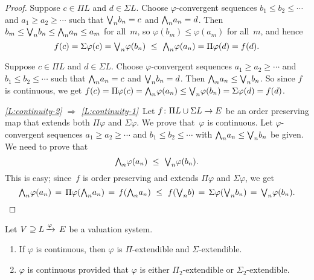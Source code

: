 \begin{proof}
Suppose $c\in \Pi L$ and $d\in \Sigma L$.
Choose $\varphi$-convergent
 sequences $b_1 \leq b_2 \leq \dotsb$
and  $a_1 \geq a_2 \geq \dotsb$ 
such that 
$\textstyle{\bigvee}_n b_n = c$
and 
$\textstyle{\bigwedge}_n a_n = d$.
Then $b_m \leq \textstyle{\bigvee}_n b_n \leq \textstyle{\bigwedge}_n a_n \leq a_m$
for all~$m$,
so $\varphi(b_m)\leq \varphi(a_m)$ for all~$m$,
and hence
\begin{equation*}
f(c) = \Sigma\varphi(c)
= \bv_n \varphi(b_n)
\ \leq\ 
\bw_n \varphi(a_n)
= \Pi \varphi(d)
= f(d).
\end{equation*}

Suppose $c\in \Pi L$ and $d\in \Sigma L$.
Choose $\varphi$-convergent sequences $a_1 \geq a_2 \geq \dotsb$ 
and $b_1 \leq b_2 \leq \dotsb$
such that $\textstyle{\bigwedge}_n a_n = c$ and $\textstyle{\bigvee}_n b_n = d$.
Then $\textstyle{\bigwedge}_n a_n \leq \textstyle{\bigvee}_n b_n $.
So since $f$ is continuous, 
we get 
$f(c)= \Pi\varphi(c) =\textstyle{\bigwedge}_n\varphi(a_n) 
\leq\textstyle{\bigvee}_n\varphi(b_n) = \Sigma\varphi(d) = f(d)$.

\vspace{.3em}

\noindent\emph{\ref{L:continuity-2}
$\Longrightarrow$
\ref{L:continuity-1}}\ 
Let $f\colon \Pi L \cup \Sigma L \rightarrow E$
be an order preserving map that extends both $\Pi\varphi$
and $\Sigma \varphi$.
We prove that~$\varphi$ is continuous.
Let $\varphi$-convergent sequences
$a_1 \geq a_2 \geq \dotsb$
and $b_1 \leq b_2 \leq \dotsb$
with $\textstyle{\bigwedge}_n a_n \leq \textstyle{\bigvee}_n b_n$
be given.
We need to prove that  
\begin{equation*}
\textstyle{\bigwedge}_n \varphi(a_n)\ \leq\  \textstyle{\bigvee}_n \varphi(b_n).
\end{equation*}
This is easy;
since~$f$ is order preserving
and extends $\Pi\varphi$ and $\Sigma\varphi$,
we get 
\begin{equation*}
\textstyle{\bigwedge}_n \varphi(a_n)
\,=\,
\Pi\varphi(\textstyle{\bigwedge}_n a_n)
\,=\,
 f(\textstyle{\bigwedge}_n a_n)
\ \leq\  
f(\textstyle{\bigvee}_n b)
\,=\,
\Sigma\varphi(\textstyle{\bigvee}_n b_n)
\,=\,
\textstyle{\bigvee}_n \varphi(b_n).\qedhere
\end{equation*}
\end{proof}
%
%
\begin{cor}
\label{C:cont-imp}
Let $V \supseteq L\,\smash{\xrightarrow{\varphi}\,E}$ be a valuation system. 
\begin{enumerate}
\item 
\label{C:cont-imp-1}
If $\varphi$ is continuous,
then $\varphi$ is $\Pi$-extendible
and $\Sigma$-extendible.

\item 
\label{C:cont-imp-2}
$\varphi$ is continuous
provided that $\varphi$ is either $\Pi_2$-extendible
or $\Sigma_2$-extendible.
\end{enumerate}
\end{cor}
